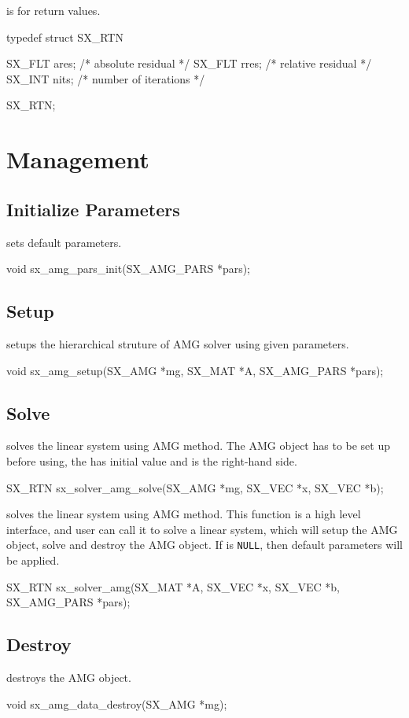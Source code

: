  is for return values.
\begin{evb}
typedef struct SX_RTN
{
    SX_FLT ares;     /* absolute residual */
    SX_FLT rres;     /* relative residual */
    SX_INT nits;     /* number of iterations */

} SX_RTN;
\end{evb}

\section{Management}

\subsection{Initialize Parameters}

 sets default parameters.
\begin{evb}
void sx_amg_pars_init(SX_AMG_PARS *pars);
\end{evb}

\subsection{Setup}
 setups the hierarchical struture of AMG solver using given parameters.
\begin{evb}
void sx_amg_setup(SX_AMG *mg, SX_MAT *A, SX_AMG_PARS *pars);
\end{evb}

\subsection{Solve}

 solves the linear system using AMG method. The AMG object has to be
set up before using, the  has initial value and  is the right-hand side.
\begin{evb}
SX_RTN sx_solver_amg_solve(SX_AMG *mg, SX_VEC *x, SX_VEC *b);
\end{evb}

 solves the linear system using AMG method. This function is a high level 
interface, and user can call it to solve a linear system, which will setup the AMG object,
solve and destroy the AMG object. If  is \verb|NULL|, then default parameters
will be applied.
\begin{evb}
SX_RTN sx_solver_amg(SX_MAT *A, SX_VEC *x, SX_VEC *b, SX_AMG_PARS *pars);
\end{evb}

\subsection{Destroy}
 destroys the AMG object.
\begin{evb}
void sx_amg_data_destroy(SX_AMG *mg);
\end{evb}

